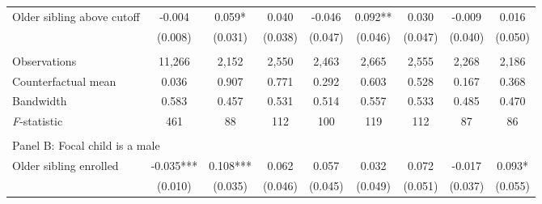 \begin{table}[!htbp]
{{\begin{tabular}{lcccccccc}
Older sibling above cutoff&      -0.004   &       0.059*  &       0.040   &      -0.046   &       0.092** &       0.030   &      -0.009   &       0.016   \\
                    &     (0.008)   &     (0.031)   &     (0.038)   &     (0.047)   &     (0.046)   &     (0.047)   &     (0.040)   &     (0.050)   \\
                    &               &               &               &               &               &               &               &               \\
Observations        &      11,266   &       2,152   &       2,550   &       2,463   &       2,665   &       2,555   &       2,268   &       2,186   \\
Counterfactual mean &       0.036   &       0.907   &       0.771   &       0.292   &       0.603   &       0.528   &       0.167   &       0.368   \\
Bandwidth           &       0.583   &       0.457   &       0.531   &       0.514   &       0.557   &       0.533   &       0.485   &       0.470   \\
\textit{F}-statistic&         461   &          88   &         112   &         100   &         119   &         112   &          87   &          86   \\
 
&  &  &  & & & & & \\
\multicolumn{10}{l}{Panel B: Focal child is a male} \\
Older sibling enrolled&      -0.035***&       0.108***&       0.062   &       0.057   &       0.032   &       0.072   &      -0.017   &       0.093*  \\
                    &     (0.010)   &     (0.035)   &     (0.046)   &     (0.045)   &     (0.049)   &     (0.051)   &     (0.037)   &     (0.055)   \\
 

\end{tabular}}}
\end{table}
